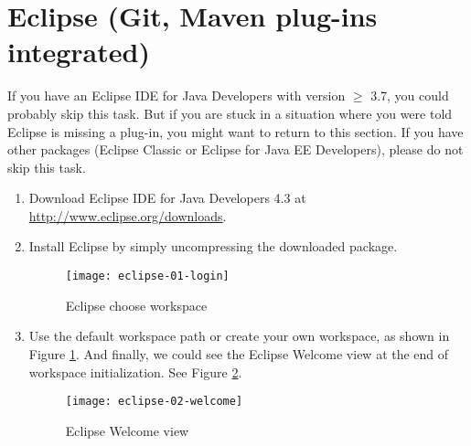 
\section{Eclipse (Git, Maven plug-ins integrated)}

If you have an Eclipse IDE for Java Developers with version $\ge$ 3.7, you could
probably skip this task. But if you are stuck in a situation where you were told
Eclipse is missing a plug-in, you might want to return to this section. If you
have other packages (Eclipse Classic or Eclipse for Java EE Developers), please
do not skip this task.

\begin{enumerate}

\item Download Eclipse IDE for Java Developers 4.3 at
\url{http://www.eclipse.org/downloads}.


\item Install Eclipse by simply uncompressing the downloaded package.

\begin{figure}[t]
\centering
\texttt{[image: eclipse-01-login]}
\caption{Eclipse choose workspace\label{eclipse-01-login}}
\end{figure}

\item Use the default workspace path or create your own workspace, as shown in
Figure \ref{eclipse-01-login}. And finally, we could see the Eclipse Welcome
view at the end of workspace initialization. See Figure
\ref{eclipse-02-welcome}.

\begin{figure}[t]
\centering
\texttt{[image: eclipse-02-welcome]}
\caption{Eclipse Welcome view\label{eclipse-02-welcome}}
\end{figure}

\end{enumerate}
